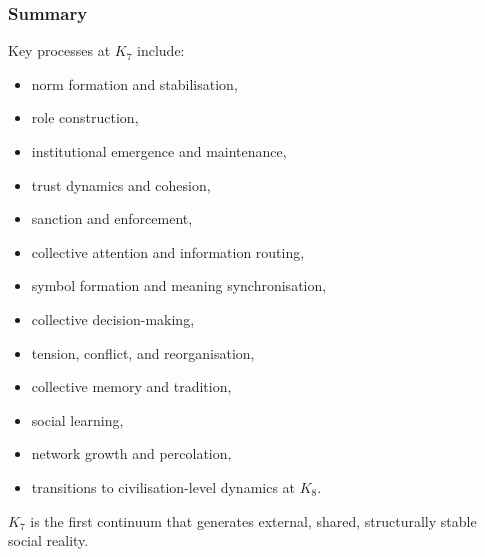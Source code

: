 \subsubsection{Summary}

Key processes at $K_7$ include:
\begin{itemize}
    \item norm formation and stabilisation,
    \item role construction,
    \item institutional emergence and maintenance,
    \item trust dynamics and cohesion,
    \item sanction and enforcement,
    \item collective attention and information routing,
    \item symbol formation and meaning synchronisation,
    \item collective decision-making,
    \item tension, conflict, and reorganisation,
    \item collective memory and tradition,
    \item social learning,
    \item network growth and percolation,
    \item transitions to civilisation-level dynamics at $K_8$.
\end{itemize}

$K_7$ is the first continuum that generates external, shared,
structurally stable social reality.
